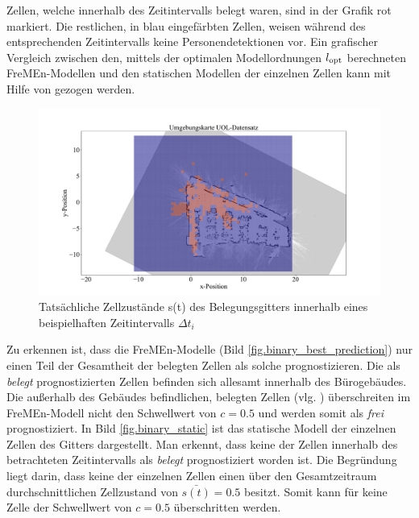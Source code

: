 Zellen, welche innerhalb des Zeitintervalls belegt waren, sind in der Grafik rot markiert. Die restlichen, in blau eingefärbten Zellen, weisen während des entsprechenden Zeitintervalls keine Personendetektionen vor. Ein grafischer Vergleich zwischen den, mittels der optimalen Modellordnungen $l_{\mathrm{opt}}$ berechneten FreMEn-Modellen und den statischen Modellen der einzelnen Zellen kann mit Hilfe von  gezogen werden.
\newpage
\begin{figure}[!ht]
	\centering
	\includegraphics[width=1.0\linewidth]{Abbildungen/evaluation/original_binary_data}
	\caption{Tatsächliche Zellzustände s(t) des Belegungsgitters innerhalb eines beispielhaften Zeitintervalls $\Delta t_i$}
	\label{fig.original_binary_data}
\end{figure}
Zu erkennen ist, dass die FreMEn-Modelle (Bild \ref{fig.binary_best_prediction}) nur einen Teil der Gesamtheit der belegten Zellen als solche prognostizieren. Die als \textit{belegt} prognostizierten Zellen befinden sich allesamt innerhalb des Bürogebäudes. Die außerhalb des Gebäudes befindlichen, belegten Zellen (vlg. ) überschreiten im FreMEn-Modell nicht den Schwellwert von $c=0.5$ und werden somit als \textit{frei} prognostiziert. In Bild \ref{fig.binary_static} ist das statische Modell der einzelnen Zellen des Gitters dargestellt. Man erkennt, dass keine der Zellen innerhalb des betrachteten Zeitintervalls als \textit{belegt} prognostiziert worden ist. Die Begründung liegt darin, dass keine der einzelnen Zellen einen über den Gesamtzeitraum durchschnittlichen Zellzustand von $\bar{s(t)} = 0.5$ besitzt. Somit kann für keine Zelle der Schwellwert von $c=0.5$ überschritten werden. 

